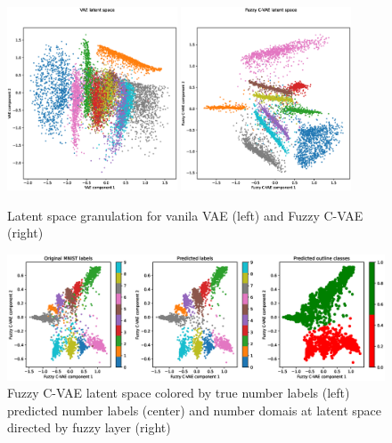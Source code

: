 \documentclass[runningheads]{llncs}
\begin{document}
\begin{figure}
    \centering
    \includegraphics[width=0.45\textwidth]{fig2a-vae-all-features.eps}
    \includegraphics[width=0.45\textwidth]{fig2b-fcvae-all-features.eps}
    
    \caption{Latent space granulation for vanila VAE (left) and Fuzzy C-VAE (right)}
    \label{fig:clustering}
\end{figure}

\begin{figure}
    \centering
    \includegraphics[width=1\textwidth]{fig3-fcvae-classification.eps}
    \caption{Fuzzy C-VAE latent space colored by true number labels (left) predicted number labels (center) and number domais at latent space directed by fuzzy layer (right) }
    \label{fig:fcvae-classes}
\end{figure}
\end{document}
